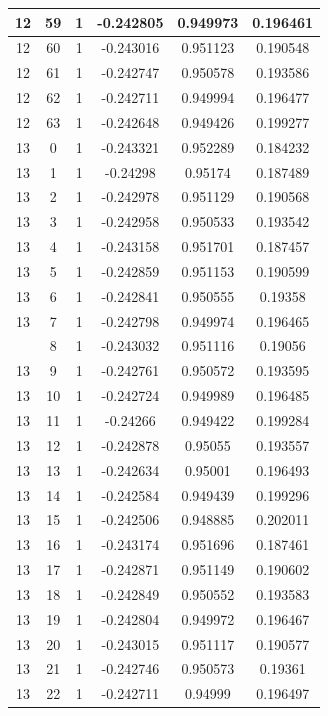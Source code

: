 \documentclass[12pt,a4paper]{article}
\numberwithin{equation}{section}
\numberwithin{figure}{section}
\numberwithin{table}{section}
\begin{document}
\begin{longtable}{|c|c|c|c|c|c|}
12 & 59 & 1 & -0.242805 & 0.949973 & 0.196461 \\ \hline
12 & 60 & 1 & -0.243016 & 0.951123 & 0.190548 \\ \hline
12 & 61 & 1 & -0.242747 & 0.950578 & 0.193586 \\ \hline
12 & 62 & 1 & -0.242711 & 0.949994 & 0.196477 \\ \hline
12 & 63 & 1 & -0.242648 & 0.949426 & 0.199277 \\ \hline
13 & 0 & 1 & -0.243321 & 0.952289 & 0.184232 \\ \hline
13 & 1 & 1 & -0.24298 & 0.95174 & 0.187489 \\ \hline
13 & 2 & 1 & -0.242978 & 0.951129 & 0.190568 \\ \hline
13 & 3 & 1 & -0.242958 & 0.950533 & 0.193542 \\ \hline
13 & 4 & 1 & -0.243158 & 0.951701 & 0.187457 \\ \hline
13 & 5 & 1 & -0.242859 & 0.951153 & 0.190599 \\ \hline
13 & 6 & 1 & -0.242841 & 0.950555 & 0.19358 \\ \hline
13 & 7 & 1 & -0.242798 & 0.949974 & 0.196465 \\ \hline
\pagebreak
13 & 8 & 1 & -0.243032 & 0.951116 & 0.19056 \\ \hline
13 & 9 & 1 & -0.242761 & 0.950572 & 0.193595 \\ \hline
13 & 10 & 1 & -0.242724 & 0.949989 & 0.196485 \\ \hline
13 & 11 & 1 & -0.24266 & 0.949422 & 0.199284 \\ \hline
13 & 12 & 1 & -0.242878 & 0.95055 & 0.193557 \\ \hline
13 & 13 & 1 & -0.242634 & 0.95001 & 0.196493 \\ \hline
13 & 14 & 1 & -0.242584 & 0.949439 & 0.199296 \\ \hline
13 & 15 & 1 & -0.242506 & 0.948885 & 0.202011 \\ \hline
13 & 16 & 1 & -0.243174 & 0.951696 & 0.187461 \\ \hline
13 & 17 & 1 & -0.242871 & 0.951149 & 0.190602 \\ \hline
13 & 18 & 1 & -0.242849 & 0.950552 & 0.193583 \\ \hline
13 & 19 & 1 & -0.242804 & 0.949972 & 0.196467 \\ \hline
13 & 20 & 1 & -0.243015 & 0.951117 & 0.190577 \\ \hline
13 & 21 & 1 & -0.242746 & 0.950573 & 0.19361 \\ \hline
13 & 22 & 1 & -0.242711 & 0.94999 & 0.196497 \\ \hline

\end{longtable}
\end{document}
